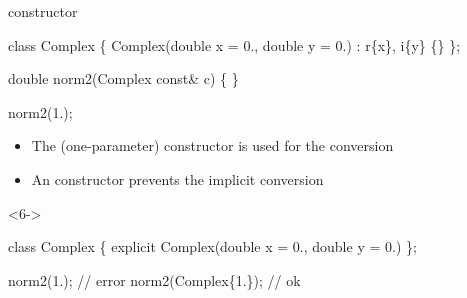 \begin{frame}[fragile]{ constructor}

  \begin{codeblock}
class Complex \{
  Complex(double x = 0., double y \alert<2-3>{= 0.}) : r\{x\}, i\{y\} \{\}
  \ddd
\};

double norm2(Complex const& c) \{ \ddd \}

norm2(1.);
\end{codeblock}

  \begin{itemize}
  \item<2-> The (one-parameter) constructor is used for the conversion
  \item<6-> An  constructor prevents the implicit conversion
  \end{itemize}

  \begin{codeblock}<6->{
class Complex \{
  \alert{explicit} Complex(double x = 0., double y = 0.) \ddd
  \ddd
\};

norm2(1.);          // error
norm2(Complex\{1.\}); // ok}\end{codeblock}

\end{frame}

